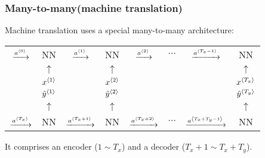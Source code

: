 \subsubsection{Many-to-many(machine translation)}
Machine translation uses a special many-to-many architecture:
\begin{center}
  \begin{tabular}{cccccccc}
    $\xrightarrow{a^{\left\langle 0\right\rangle}}$& NN & $\xrightarrow{a^{\left\langle 1\right\rangle}}$ & NN & $\xrightarrow{a^{\left\langle 2\right\rangle}}$ & $\cdots$ & $\xrightarrow{a^{\left\langle T_x-1\right\rangle}}$ & NN \\ 
    & $\uparrow$ & & $\uparrow$ & & & & $\uparrow$ \\
    & $x^{\left\langle 1\right\rangle}$ & & $x^{\left\langle 2\right\rangle}$ & & & & $x^{\left\langle T_x\right\rangle}$ \\\arrayrulecolor{red}\hline
    & $\hat{y}^{\left\langle 1\right\rangle}$ & & $\hat{y}^{\left\langle 2\right\rangle}$ & & & & $\hat{y}^{\left\langle T_y\right\rangle}$\\
    & $\uparrow$ & & $\uparrow$ & & & & $\uparrow$\\
    $\xrightarrow{a^{\left\langle T_x\right\rangle}}$ & NN & $\xrightarrow{a^{\left\langle T_x+1\right\rangle}}$ & NN & $\xrightarrow{a^{\left\langle T_x+2\right\rangle}}$ &  $\cdots$ & $\xrightarrow{a^{\left\langle T_x+T_y-1\right\rangle}}$ & NN \\
  \end{tabular}
\end{center}
It comprises an encoder ($1\sim T_x$) and a decoder ($T_x+1\sim T_x+T_y$).
